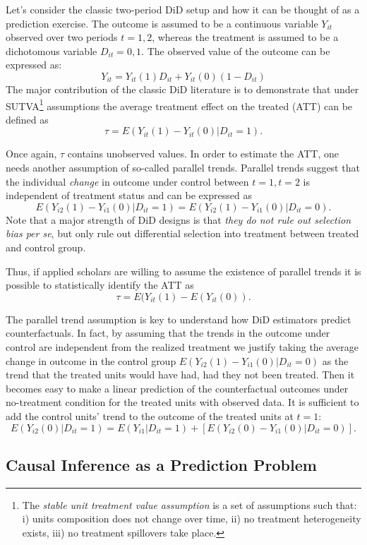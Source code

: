 \documentclass[hidelinks]{article}\usepackage[]{graphicx}\usepackage[]{color}
\begin{document}
Let's consider the classic two-period DiD setup and how it can be thought of as a prediction exercise. The outcome is assumed to be a continuous variable $Y_{it}$ observed over two periods $t=1, 2$, whereas the treatment is assumed to be a dichotomous variable $D_{it} = 0, 1$. The observed value of the outcome can be expressed as:
$$ Y_{it} = Y_{it}(1)D_{it} + Y_{it}(0)(1 - D_{it}) $$
The major contribution of the classic DiD literature \parencite[e.g.,][]{Angrist2009} is to demonstrate that under SUTVA\footnote{The \textit{stable unit treatment value assumption} is a set of assumptions such that: i) units composition does not change over time, ii) no treatment heterogeneity exists, iii) no treatment spillovers take place.} assumptions the average treatment effect on the treated (ATT) can be defined as
$$ \tau = E(Y_{it} (1) - Y_{it}(0) | D_{it} = 1). $$

Once again, $\tau$ contains unobserved values. In order to estimate the ATT, one needs another assumption of so-called parallel trends. Parallel trends suggest that the individual \textit{change} in outcome under control between $t = 1, t= 2$ is independent of treatment status and can be expressed as
$$ E(Y_{i2} (1) - Y_{i1}(0) | D_{it} = 1) = E(Y_{i2} (1) - Y_{i1}(0) | D_{it} = 0). $$
Note that a major strength of DiD designs is that \textit{they do not rule out selection bias per se}, but only rule out differential selection into treatment between treated and control group.

Thus, if applied scholars are willing to assume the existence of parallel trends it is possible to statistically identify the ATT as
$$ \tau = E(Y_{it}(1) - E(Y_{it}(0)).$$

The parallel trend assumption is key to understand how DiD estimators predict counterfactuals. In fact, by assuming that the trends in the outcome under control are independent from the realized treatment we justify taking the average change in outcome in the control group $E(Y_{i2} (1) - Y_{i1}(0) | D_{it} = 0)$ as the trend that the treated units would have had, had they not been treated. Then it becomes easy to make a linear prediction of the counterfactual outcomes under no-treatment condition for the treated units with observed data. It is sufficient to add the control units' trend to the outcome of the treated units at $t=1$:
$$ E(Y_{i2}(0) | D_{it} = 1) = E(Y_{i1} | D_{it} = 1) + \left[ E(Y_{i2} (0) - Y_{i1}(0) | D_{it} = 0) \right] .$$

\subsection{Causal Inference as a Prediction Problem}
\end{document}
